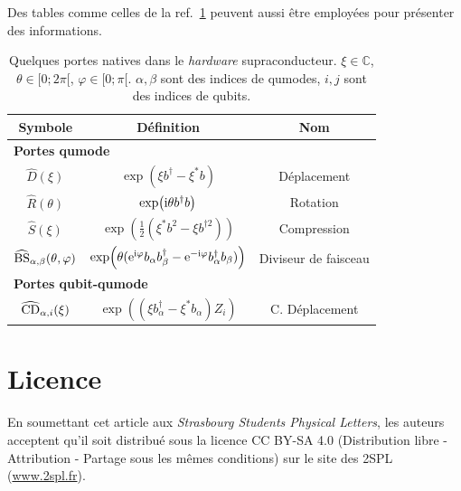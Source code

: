 \documentclass[
 reprint,
 preprintnumbers,
 nobibnotes,
 nofootinbib,
 longbibliography,
 amsmath,amssymb,
 aps,prl,
 onecolumn
]{revtex4-2}
\begin{document}
Des tables comme celles de la ref.~\ref{tab:gates} peuvent aussi être employées pour présenter des informations.

\begin{table}[ht]
\begin{ruledtabular}
    \centering
    \begin{tabular}{ccc}
        Symbole & Définition & Nom \\ \hline
        \multicolumn{3}{l}{\bf Portes qumode} \\ \hline
        $\hat{D} (\xi)$ & $\exp( \xi  b^\dag - \xi^\ast b )$ & Déplacement \\
        $\hat{R} (\theta)$ & $\exp( {\rm i} \theta  b^\dag b )$ & Rotation \\
        $\hat{S} (\xi)$ & $\exp( \frac{1}{2} (\xi^\ast  b^2 - \xi b^{\dag2}) )$ & Compression \\
        $\widehat{\rm BS}_{\alpha,\beta} (\theta,\varphi)$ & $\exp( \theta ( {\rm e}^{{\rm i}\varphi} b_\alpha b_\beta^\dag - {\rm e}^{-{\rm i}\varphi} b_\alpha^\dag b_\beta) )$ & Diviseur de faisceau \\ \hline
        \multicolumn{3}{l}{{\bf Portes qubit-qumode}} \\ \hline
        $\widehat{\rm CD}_{\alpha,i} (\xi)$ & $\exp( (\xi  b_\alpha^\dag - \xi^\ast b_\alpha) Z_i )$ & C. Déplacement
    \end{tabular}
    \caption{Quelques portes natives dans le {\em hardware} supraconducteur. $\xi\in\mathbb{C}$, $\theta\in [0;2\pi[$, $\varphi\in[0;\pi[$. $\alpha,\beta$ sont des indices de qumodes, $i,j$ sont des indices de qubits.}
    \label{tab:gates}
\end{ruledtabular}
\end{table}




\section*{Licence}

En soumettant cet article aux {\em Strasbourg Students Physical Letters}, les auteurs acceptent qu'il soit distribué sous la licence CC BY-SA 4.0 (Distribution libre - Attribution - Partage sous les mêmes conditions) sur le site des 2SPL (\url{www.2spl.fr}).
\end{document}
